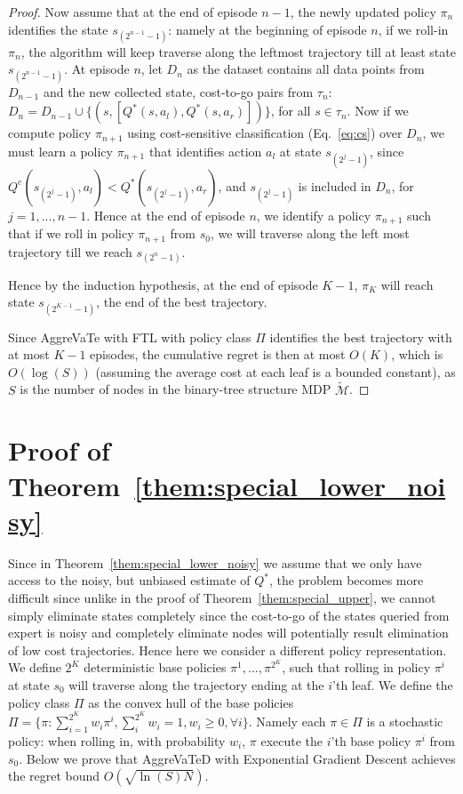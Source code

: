 \documentclass{article}
\begin{document}
\begin{proof}
Now assume that at the end of episode $n-1$, the newly updated policy $\pi_{n}$ identifies the state $s_{(2^{n-1}-1)}$: namely at the beginning of episode $n$, if we roll-in $\pi_n$, the algorithm will keep traverse along the leftmost trajectory till at least state $s_{(2^{n-1}-1)}$. At episode $n$, let $D_n$ as the dataset contains all data points from $D_{n-1}$ and the new collected state, cost-to-go pairs from $\tau_n$: $D_n = D_{n-1}\cup \{(s, [Q^*(s,a_l),Q^*(s,a_r)])\} $, for all $s\in\tau_n$. Now if we compute policy $\pi_{n+1}$ using cost-sensitive classification (Eq.~\ref{eq:cs}) over $D_n$, we must learn a policy $\pi_{n+1}$ that identifies action $a_l$ at state $s_{(2^{j}-1)}$, since $Q^{e}(s_{(2^{j}-1)}, a_l)< Q^*(s_{(2^{j}-1)}, a_r)$, and $s_{(2^j - 1)}$ is included in $D_n$, for $j=1,..., n-1$.  Hence at the end of episode $n$, we identify a policy $\pi_{n+1}$ such that if we roll in policy $\pi_{n+1}$ from $s_0$, we will traverse along the left most trajectory till we reach $s_{(2^n-1)}$.  

Hence by the induction hypothesis, at the end of episode $K-1$, $\pi_{K}$ will reach state $s_{(2^{K-1}-1)}$, the end of the best trajectory.

Since AggreVaTe with FTL with policy class $\Pi$ identifies the best trajectory with at most $K-1$ episodes, the cumulative regret is then at most $O(K)$, which is $O(\log(S))$ (assuming the average cost at each leaf is a bounded constant), as $S$ is the number of nodes in the binary-tree structure MDP $\tilde{\mathcal{M}}$.
\end{proof}


\section{Proof of Theorem~\ref{them:special_lower_noisy}}
\label{sec:proof_special_noisy}
Since in Theorem~\ref{them:special_lower_noisy} we assume that we only have access to the noisy, but unbiased estimate of $Q^*$, the problem becomes more difficult since unlike in the proof of Theorem~\ref{them:special_upper}, we cannot simply eliminate states completely since the cost-to-go of the states queried from expert is noisy and completely eliminate nodes will potentially result elimination of low cost trajectories. Hence here we consider a different policy representation. We define $2^{K}$ deterministic base policies $\pi^1, ..., \pi^{2^K}$, such that rolling in policy $\pi^i$ at state $s_0$ will traverse along the trajectory ending at the $i$'th leaf. We define the policy class $\Pi$ as the convex hull of the base policies $\Pi = \{\pi: \sum_{i=1}^{2^K}w_i\pi^i, \sum_i^{2^K}w_i = 1, w_i\geq 0, \forall i\}$. Namely each $\pi\in\Pi$ is a stochastic policy: when rolling in, with probability $w_i$, $\pi$ execute the $i$'th base policy $\pi^i$ from $s_0$. Below we prove that AggreVaTeD with Exponential Gradient Descent achieves the regret bound $O(\sqrt{\ln(S) N})$.
\end{document}

